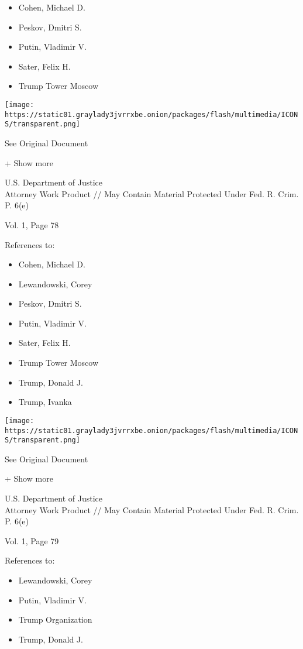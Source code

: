 \begin{itemize}
\tightlist
\item
  Cohen, Michael D.
\item
  Peskov, Dmitri S.
\item
  Putin, Vladimir V.
\item
  Sater, Felix H.
\item
  Trump Tower Moscow
\end{itemize}

\protect\hyperlink{}{}

\texttt{[image: https://static01.graylady3jvrrxbe.onion/packages/flash/multimedia/ICONS/transparent.png]}

See Original Document

+ Show more

U.S. Department of Justice\\
Attorney Work Product // May Contain Material Protected Under Fed. R.
Crim. P. 6(e)

Vol. 1, Page 78

References to:

\begin{itemize}
\tightlist
\item
  Cohen, Michael D.
\item
  Lewandowski, Corey
\item
  Peskov, Dmitri S.
\item
  Putin, Vladimir V.
\item
  Sater, Felix H.
\item
  Trump Tower Moscow
\item
  Trump, Donald J.
\item
  Trump, Ivanka
\end{itemize}

\protect\hyperlink{}{}

\texttt{[image: https://static01.graylady3jvrrxbe.onion/packages/flash/multimedia/ICONS/transparent.png]}

See Original Document

+ Show more

U.S. Department of Justice\\
Attorney Work Product // May Contain Material Protected Under Fed. R.
Crim. P. 6(e)

Vol. 1, Page 79

References to:

\begin{itemize}
\tightlist
\item
  Lewandowski, Corey
\item
  Putin, Vladimir V.
\item
  Trump Organization
\item
  Trump, Donald J.
\end{itemize}


